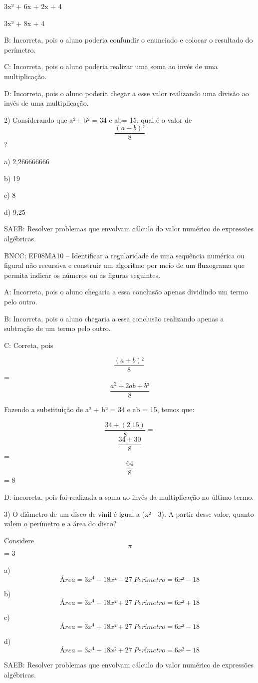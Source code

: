 3x² + 6x + 2x + 4

3x² + 8x + 4

B: Incorreta, pois o aluno poderia confundir o enunciado e colocar o
resultado do perímetro.

C: Incorreta, pois o aluno poderia realizar uma soma ao invés de uma
multiplicação.

D: Incorreta, pois o aluno poderia chegar a esse valor realizando uma
divisão ao invés de uma multiplicação.

2) Considerando que a²+ b² = 34 e ab= 15, qual é o valor de
\[\frac{(a + b)²}{8}\] ?

a) 2,266666666

b) 19

c) 8

d) 9,25

SAEB: Resolver problemas que envolvam cálculo do valor numérico de
expressões algébricas.

BNCC: EF08MA10 -- Identificar a regularidade de uma sequência numérica
ou figural não recursiva e construir um algoritmo por meio de um
fluxograma que permita indicar os números ou as figuras seguintes.

A: Incorreta, pois o aluno chegaria a essa conclusão apenas dividindo um
termo pelo outro.

B: Incorreta, pois o aluno chegaria a essa conclusão realizando apenas a
subtração de um termo pelo outro.

C: Correta, pois

\[\frac{(a + b)²}{8}\ \] = \[\frac{a^{2} + 2ab + b²}{8}\]

Fazendo a substituição de a² + b² = 34 e ab = 15, temos que:

\[\frac{34 + (2.15)}{8} =\] \[\frac{34 + 30}{8}\] = \[\frac{64}{8}\] = 8

D: incorreta, pois foi realizada a soma ao invés da multiplicação no
último termo.

3) O diâmetro de um disco de vinil é igual a (x² - 3). A partir desse
valor, quanto valem o perímetro e a área do disco?

Considere \[\pi\] = 3

a) \[Área = 3x^4 - 18x² - 27 \;Perímetro= 6x² - 18\]

b) \[Área = 3x^4 - 18x² + 27 \;Perímetro= 6x² + 18\]

c) \[Área = 3x^4 + 18x² + 27 \;Perímetro= 6x² - 18\]

d) \[Área = 3x^4 - 18x² + 27 \;Perímetro= 6x² - 18\]

SAEB: Resolver problemas que envolvam cálculo do valor numérico de
expressões algébricas.


